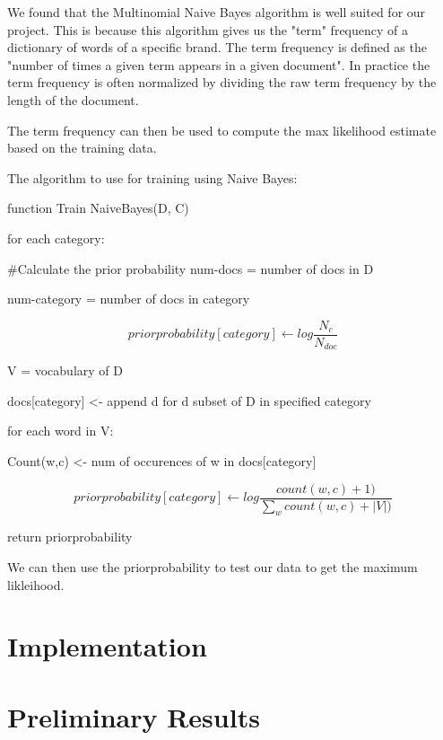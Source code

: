 \documentclass{article}
\begin{document}
We found that the Multinomial Naive Bayes algorithm is well suited for our project. This is because this algorithm gives us the "term" frequency of a dictionary of words of a specific brand.
The term frequency is defined as the "number of times a given term appears in a given document". In practice the term frequency is often normalized by dividing the raw term frequency by the length of the document.

The term frequency can then be used to compute the max likelihood estimate based on the training data.

The algorithm to use for training using Naive Bayes:

function Train NaiveBayes(D, C)

for each category:

#Calculate the prior probability
num-docs = number of docs in D

num-category = number of docs in category

\[priorprobability[category] \leftarrow log \frac{N_{c}}{N_{doc}}\]

 V = vocabulary of D

 docs[category] <- append d for d subset of D in specified category

 for each word in V:

    Count(w,c) <- num of occurences of w in docs[category]

    \[priorprobability[category] \leftarrow log \frac{count(w,c) +1)}{\sum_{w} count(w,c) + |V|)}\]

return priorprobability

We can then use the priorprobability to test our data to get the maximum likleihood.

\maketitle
\section{Implementation} %

 \maketitle
\section{Preliminary Results} %
\end{document}
